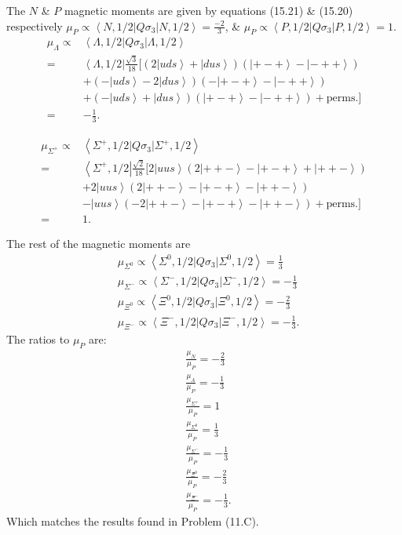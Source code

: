 \documentclass[main.tex]{subfiles}
\begin{document}
The $N$ \& $P$ magnetic moments are given by equations (15.21) \& (15.20) respectively $\mu_P\propto\left<N,1/2|Q\sigma_3|N,1/2\right>=\frac{-2}{3}$, \& $\mu_P\propto\left<P,1/2|Q\sigma_3|P,1/2\right>=1$.
\begin{align}
\mu_{\Lambda}\propto&\left<\Lambda,1/2|Q\sigma_3|\Lambda,1/2\right>\nonumber\\
=&\left<\Lambda,1/2\right|\frac{\sqrt{3}}{18}\Big[(2\left|uds\right>+\left|dus\right>)(\left|+-+\right>-\left|-++\right>)\nonumber\\
&+(-\left|uds\right>-2\left|dus\right>)(-\left|+-+\right>-\left|-++\right>)\nonumber\\
&+(-\left|uds\right>+\left|dus\right>)(\left|+-+\right>-\left|-++\right>)+\text{perms.}\Big]\\
=&-\frac{1}{3}.
\end{align}

\begin{align}
\mu_{\Sigma^+}\propto&\left<\Sigma^+,1/2|Q\sigma_3|\Sigma^+,1/2\right>\nonumber\\
=&\left<\Sigma^+,1/2\right|\frac{\sqrt{2}}{18}\Big[ 2\left|uus\right>(2\left|++-\right>-\left|+-+\right>+\left|++-\right>)\nonumber\\
&+2\left|uus\right>(2\left|++-\right>-\left|+-+\right>-\left|++-\right>)\nonumber\\
&-\left|uus\right>(-2\left|++-\right>-\left|+-+\right>-\left|++-\right>)+\text{perms.}\Big]\\
=&1.
\end{align}

The rest of the magnetic moments are
\begin{align}
&\mu_{\Sigma^0}\propto\left<\Sigma^0,1/2|Q\sigma_3|\Sigma^0,1/2\right>=\frac{1}{3}\\
&\mu_{\Sigma^-}\propto\left<\Sigma^-,1/2|Q\sigma_3|\Sigma^-,1/2\right>=-\frac{1}{3}\\
&\mu_{\Xi^0}\propto\left<\Xi^0,1/2|Q\sigma_3|\Xi^0,1/2\right>=-\frac{2}{3}\\
&\mu_{\Xi^-}\propto\left<\Xi^-,1/2|Q\sigma_3|\Xi^-,1/2\right>=-\frac{1}{3}.
\end{align}
The ratios to $\mu_P$ are:
\begin{align}
&\frac{\mu_{N}}{\mu_{P}}=-\frac{2}{3}\\
&\frac{\mu_{\Lambda}}{\mu_{P}}=-\frac{1}{3}\\
&\frac{\mu_{\Sigma^+}}{\mu_{P}}=1\\
&\frac{\mu_{\Sigma^0}}{\mu_{P}}=\frac{1}{3}\\
&\frac{\mu_{\Sigma^-}}{\mu_{P}}=-\frac{1}{3}\\
&\frac{\mu_{\Xi^0}}{\mu_{P}}=-\frac{2}{3}\\
&\frac{\mu_{\Xi^-}}{\mu_{P}}=-\frac{1}{3}.
\end{align}
Which matches the results found in Problem (11.C).
\end{document}
